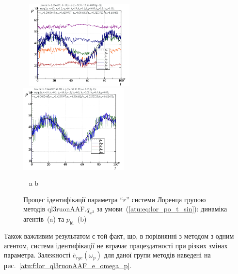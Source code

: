 \begin{figure}[ht!]
  \begin{center}
    ~ \hfill
    \includegraphics[width=0.49\textwidth]{p/cha/lor/ql3ruonAAF/lor_ql3ruonAAF_qy2-p_t_pi_sin.png}
    \hfill
    \includegraphics[width=0.49\textwidth]{p/cha/lor/ql3ruonAAF/lor_ql3ruonAAF_qy2-p_t_pz_sin.png}
    \hfill ~
  \end{center}
  \vspace{-1.0ex}
  \begin{center}
    ~ \hfill a \hfill\hfill b \hfill ~
  \end{center}
  \vspace{-1.5ex}
  \caption{Процес ідентифікації параметра ``$r$'' системи Лоренца групою методів ql3ruonAAF.$q_{x^2} $ за умови~(\ref{atu:eq:lor_po_t_sin}): динаміка агентів~(a) та $p_\mathrm{id}$~(b)}
  \label{atu:f:lor_id_ql3ruonAAF.q_y2_sin}
\end{figure}

Також важливим результатом є той факт, що, в порівнянні з
методом з одним агентом, система ідентифікації не втрачає
працездатності при різких змінах параметра. Залежності
$ \overline{e}_{rge} (\omega_p) $ для даної групи методів наведені на
рис.~\ref{atu:f:lor_ql3ruonAAF_e_omega_p}.


